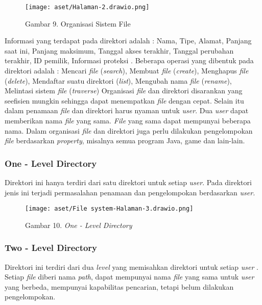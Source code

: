 \documentclass[12pt]{article}
\begin{document}
\begin{itemize}
	\begin{figure}[h!]
		\centering
		\texttt{[image: aset/Halaman-2.drawio.png]}
		\captionsetup{labelformat=empty}
		\caption{Gambar 9. Organisasi Sistem File}
	\end{figure}
	Informasi yang terdapat pada direktori adalah :  Nama, Tipe, Alamat, Panjang saat ini,  Panjang maksimum, Tanggal akses terakhir, Tanggal perubahan terakhir, ID pemilik, Informasi proteksi . Beberapa operasi yang dibentuk pada direktori adalah : Mencari \textit{file} (\textit{search}),  Membuat \textit{file} (\textit{create}), Menghapus \textit{file} (\textit{delete}), Mendaftar suatu direktori (\textit{list}), Mengubah nama \textit{file} (\textit{r\textit{ename}}),  Melintasi sistem \textit{file }(\textit{traverse})   
	Organisasi \textit{file} dan direktori disarankan yang seefisien mungkin sehingga dapat menempatkan \textit{file} dengan cepat. Selain itu dalam penamaan \textit{file} dan direktori harus nyaman untuk\textit{ user}. Dua \textit{user} dapat memberikan nama \textit{file} yang sama. \textit{File} yang sama dapat mempunyai beberapa nama. Dalam organisasi \textit{file} dan direktori juga perlu dilakukan pengelompokan \textit{file }berdasarkan \textit{property}, misalnya semua program Java, game dan lain-lain. 
	
	\subsubsection{One - Level Directory}
	Direktori ini hanya terdiri dari satu direktori untuk setiap\textit{ user}. Pada direktori jenis ini terjadi permasalahan penamaan dan pengelompokan berdasarkan \textit{user.} 
	\begin{figure}[h!]
		\centering
		\texttt{[image: aset/File system-Halaman-3.drawio.png]}
		\captionsetup{labelformat=empty}
		\caption{Gambar 10.\textit{ One - Level Directory}}
	\end{figure}
	
	\subsubsection{Two - Level Directory}
	Direktori ini terdiri dari dua \textit{level} yang memisahkan direktori untuk setiap \textit{user} . Setiap \textit{file} diberi nama \textit{path}, dapat mempunyai nama \textit{file} yang sama untuk \textit{user} yang berbeda, mempunyai kapabilitas pencarian, tetapi belum dilakukan pengelompokan. 
	

\end{itemize}
\end{document}
